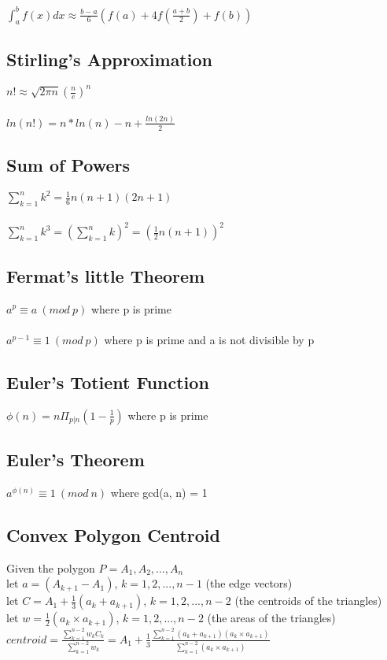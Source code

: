$\int_a^bf(x)dx \approx \frac{b-a}{6}(f(a) + 4f(\frac{a+b}{2}) + f(b))$

\subsection{Stirling's Approximation}

$n! \approx \sqrt{2{\pi}n}(\frac{n}{e})^n$\\
\\
$ln(n!) = n*ln(n) - n + \frac{ln(2n)}{2}$

\subsection{Sum of Powers}

$\sum_{k=1}^nk^2 = \frac{1}{6}n(n+1)(2n+1)$\\
\\
$\sum_{k=1}^nk^3 = (\sum_{k=1}^nk)^2 = (\frac{1}{2}n(n+1))^2$

\subsection{Fermat's little Theorem}

$a^p \equiv a\ (mod\ p)$ where p is prime\\
\\
$a^{p-1} \equiv 1\ (mod\ p)$ where p is prime and a is not divisible by p

\subsection{Euler's Totient Function}

$\phi(n) = n\Pi_{p|n}(1-\frac{1}{p})$ where p is prime

\subsection{Euler's Theorem}

$a^{\phi(n)} \equiv 1\ (mod\ n)$ where gcd(a, n) = 1

\subsection{Convex Polygon Centroid}

Given the polygon $P = A_1,A_2,...,A_n$\\
let $a = (A_{k+1} - A_1)$, $k = 1,2,...,n-1$ (the edge vectors)\\
let $C = A_1 + \frac{1}{3}(a_k + a_{k+1})$, $k = 1,2,...,n-2$ (the centroids of the triangles)\\
let $w = \frac{1}{2}(a_k{\times}a_{k+1})$, $k = 1,2,...,n-2$ (the areas of the triangles)\\
$centroid = \frac{\sum_{k=1}^{n-2}w_kC_k}{\sum_{k=1}^{n-2}w_k} = A_1 + \frac{1}{3}\frac{\sum_{k=1}^{n-2}(a_k+a_{k+1})(a_k{\times}a_{k+1})}{\sum_{k=1}^{n-2}(a_k{\times}a_{k+1})}$

